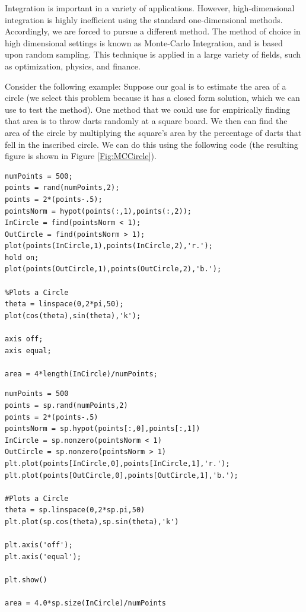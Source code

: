 


Integration is important in a variety of applications. However, high-dimensional integration is highly inefficient using the standard one-dimensional methods. Accordingly, we are forced to pursue a different method. The method of choice in high dimensional settings is known as Monte-Carlo Integration, and is based upon random sampling. This technique is applied in a large variety of fields, such as optimization, physics, and finance.

Consider the following example: Suppose our goal is to estimate the area of a circle (we select this problem because it has a closed form solution, which we can use to test the method). One method that we could use for empirically finding that area is to throw darts randomly at a square board. We then can find the area of the circle by multiplying the square's area by the percentage of darts that fell in the inscribed circle. We can do this using the following code (the resulting figure is shown in Figure \ref{Fig:MCCircle}).

\begin{matlab}
\begin{lstlisting}[style=matlab]
numPoints = 500;
points = rand(numPoints,2);
points = 2*(points-.5);
pointsNorm = hypot(points(:,1),points(:,2));
InCircle = find(pointsNorm < 1);
OutCircle = find(pointsNorm > 1);
plot(points(InCircle,1),points(InCircle,2),'r.');
hold on;
plot(points(OutCircle,1),points(OutCircle,2),'b.');

%Plots a Circle
theta = linspace(0,2*pi,50);
plot(cos(theta),sin(theta),'k');

axis off;
axis equal;

area = 4*length(InCircle)/numPoints;
\end{lstlisting}
\end{matlab}

\begin{python}
\begin{lstlisting}[style=python]
numPoints = 500
points = sp.rand(numPoints,2)
points = 2*(points-.5)
pointsNorm = sp.hypot(points[:,0],points[:,1])
InCircle = sp.nonzero(pointsNorm < 1)
OutCircle = sp.nonzero(pointsNorm > 1)
plt.plot(points[InCircle,0],points[InCircle,1],'r.');
plt.plot(points[OutCircle,0],points[OutCircle,1],'b.');

#Plots a Circle
theta = sp.linspace(0,2*sp.pi,50)
plt.plot(sp.cos(theta),sp.sin(theta),'k')

plt.axis('off');
plt.axis('equal');

plt.show()

area = 4.0*sp.size(InCircle)/numPoints

\end{lstlisting}
\end{python}

